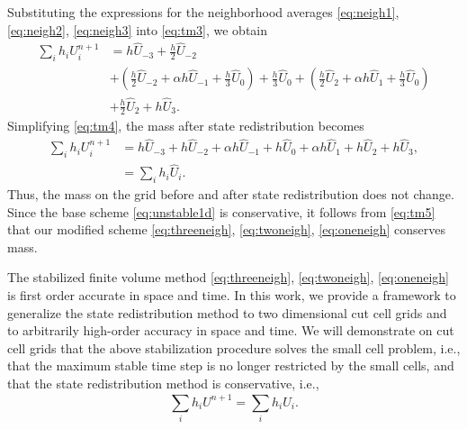 Substituting the expressions for the neighborhood averages \eqref{eq:neigh1}, \eqref{eq:neigh2}, \eqref{eq:neigh3} into \eqref{eq:tm3}, we obtain
\begin{equation}\label{eq:tm4}
\begin{aligned}
\sum_{i} h_i U^{n+1}_i  &= h \widehat{U}_{-3} + \frac{h}{2}\widehat{U}_{-2} \\
&+ \left(\frac{h}{2} \widehat{U}_{-2} + \alpha h \widehat{U}_{-1} + \frac{h}{3}\widehat{U}_{0}\right) + \frac{h}{3} \widehat{U}_0 + \left(\frac{h}{2} \widehat{U}_{2} + \alpha h \widehat{U}_{1} + \frac{h}{3}\widehat{U}_{0}\right) \\
&+ \frac{h}{2}\widehat{U}_{2} + h \widehat{U}_3.
\end{aligned}
\end{equation}
Simplifying \eqref{eq:tm4}, the mass after state redistribution becomes
\begin{equation}\label{eq:tm5}
\begin{aligned}
\sum_{i} h_i U^{n+1}_i  &= h \widehat{U}_{-3} + h \widehat{U}_{-2} + \alpha h \widehat{U}_{-1} +h \widehat{U}_0+\alpha h \widehat{U}_{1} + h \widehat{U}_{2} + h \widehat{U}_{3},\\
&= \sum_{i} h_i \widehat{U}_i.
\end{aligned}
\end{equation}
Thus, the mass on the grid before and after state redistribution does not change.
Since the base scheme \eqref{eq:unstable1d} is conservative, it follows from \eqref{eq:tm5} that our modified scheme \eqref{eq:threeneigh}, \eqref{eq:twoneigh}, \eqref{eq:oneneigh} conserves mass.




The stabilized finite volume method \eqref{eq:threeneigh}, \eqref{eq:twoneigh}, \eqref{eq:oneneigh} is first order accurate in space and time.  In this work, we provide a framework to generalize the state redistribution method to two dimensional cut cell grids and to arbitrarily high-order accuracy in space and time.
We will demonstrate on cut cell grids that the above stabilization procedure solves the small cell problem, i.e., that the maximum stable time step is no longer restricted by the small cells, and that the state redistribution method is conservative, i.e.,
$$
 \sum_{i}h_i U^{n+1} = \sum_{i}h_i \widehat{U}_i.
$$



